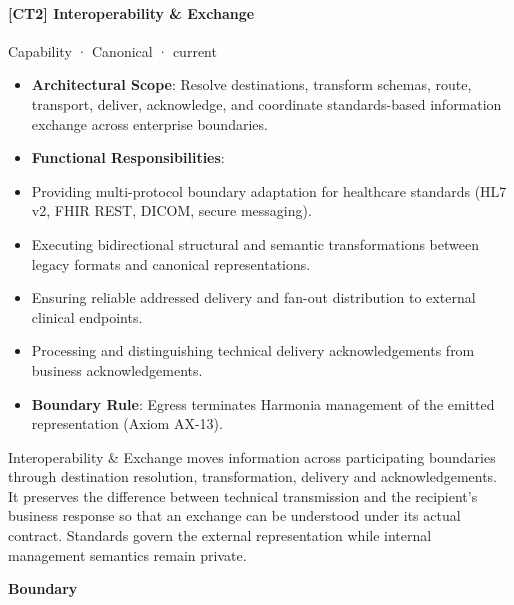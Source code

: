 \paragraph{[CT2] Interoperability \& Exchange}

\label{element:0f2e5222874949d8b0cce234941ecb20}
{\small Capability · Canonical · current}\par

\begin{itemize}


\item \textbf{Architectural Scope}: Resolve destinations, transform schemas, route, transport, deliver, acknowledge, and coordinate standards-based information exchange across enterprise boundaries.

\item \textbf{Functional Responsibilities}:

\item Providing multi-protocol boundary adaptation for healthcare standards (HL7 v2, FHIR REST, DICOM, secure messaging).

\item Executing bidirectional structural and semantic transformations between legacy formats and canonical representations.

\item Ensuring reliable addressed delivery and fan-out distribution to external clinical endpoints.

\item Processing and distinguishing technical delivery acknowledgements from business acknowledgements.

\item \textbf{Boundary Rule}: Egress terminates Harmonia management of the emitted representation (Axiom AX-13).

\end{itemize}


Interoperability \& Exchange moves information across participating boundaries through destination resolution, transformation, delivery and acknowledgements. It preserves the difference between technical transmission and the recipient's business response so that an exchange can be understood under its actual contract. Standards govern the external representation while internal management semantics remain private.



\textbf{Boundary}



